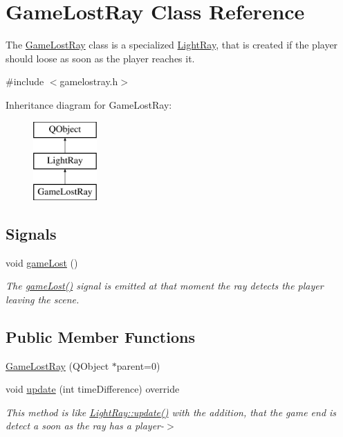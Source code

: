 \hypertarget{class_game_lost_ray}{}\section{Game\+Lost\+Ray Class Reference}
\label{class_game_lost_ray}


The \hyperlink{class_game_lost_ray}{Game\+Lost\+Ray} class is a specialized \hyperlink{class_light_ray}{Light\+Ray}, that is created if the player should loose as soon as the player reaches it.  




{\ttfamily \#include $<$gamelostray.\+h$>$}

Inheritance diagram for Game\+Lost\+Ray\+:\begin{figure}[H]
\begin{center}
\leavevmode
\includegraphics[height=3.000000cm]{class_game_lost_ray}
\end{center}
\end{figure}
\subsection*{Signals}
\begin{DoxyCompactItemize}
\item 
void \hyperlink{class_game_lost_ray_a9b2afbad70387bd9ec8f80170760ef57}{game\+Lost} ()
\begin{DoxyCompactList}\small\item\em The \hyperlink{class_game_lost_ray_a9b2afbad70387bd9ec8f80170760ef57}{game\+Lost()} signal is emitted at that moment the ray detects the player leaving the scene. \end{DoxyCompactList}\end{DoxyCompactItemize}
\subsection*{Public Member Functions}
\begin{DoxyCompactItemize}
\item 
\hyperlink{class_game_lost_ray_a15ec367ee8dfd87bc8deccde5553f8e6}{Game\+Lost\+Ray} (Q\+Object $\ast$parent=0)
\item 
void \hyperlink{class_game_lost_ray_a417d814372891fe7595a7e745b7a9f0f}{update} (int time\+Difference) override
\begin{DoxyCompactList}\small\item\em This method is like \hyperlink{class_light_ray_acf06a71a307433fa5b220baccf809e64}{Light\+Ray\+::update()} with the addition, that the game end is detect a soon as the ray has a player-\/$>$ \end{DoxyCompactList}\end{DoxyCompactItemize}
